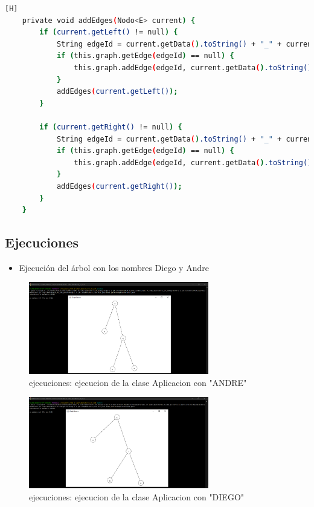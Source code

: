 \documentclass{article}
\begin{document}
	\begin{lstlisting}[language=bash,caption={Clase GraphAVLWord: addEdges()}][H]
	private void addEdges(Nodo<E> current) {
        if (current.getLeft() != null) {
            String edgeId = current.getData().toString() + "_" + current.getLeft().getData().toString();
            if (this.graph.getEdge(edgeId) == null) {
                this.graph.addEdge(edgeId, current.getData().toString(), current.getLeft().getData().toString());
            }
            addEdges(current.getLeft());
        }

        if (current.getRight() != null) {
            String edgeId = current.getData().toString() + "_" + current.getRight().getData().toString();
            if (this.graph.getEdge(edgeId) == null) {
                this.graph.addEdge(edgeId, current.getData().toString(), current.getRight().getData().toString());
            }
            addEdges(current.getRight());
        }
    }
	\end{lstlisting}
	\subsection{Ejecuciones}
	\begin{itemize}	
		\item Ejecución del árbol con los nombres Diego y Andre
	\end{itemize}
	\begin{figure}[H]
	\centering
	\includegraphics[width=0.7\textwidth,keepaspectratio]{img/ejecucion_word_ANDRE.png}
	\caption{ejecuciones: ejecucion de la clase Aplicacion con "ANDRE"}
\end{figure}
\begin{figure}[H]
	\centering
	\includegraphics[width=0.7\textwidth,keepaspectratio]{img/ejecucion_word_DIEGO.png}
	\caption{ejecuciones: ejecucion de la clase Aplicacion con "DIEGO"}
\end{figure}
\end{document}
